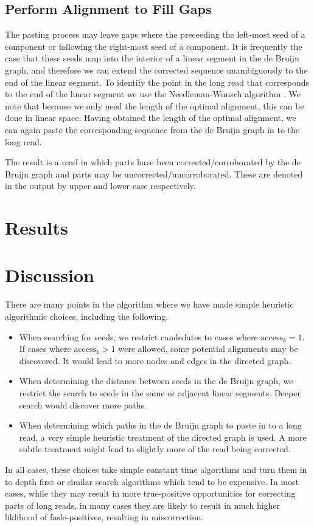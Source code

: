\documentclass[twocolumn]{article}
\begin{document}
\subsection{Perform Alignment to Fill Gaps}
\label{sec:gaps}

The pasting process may leave gaps where the preceeding the left-most
seed of a component or following the right-most seed of a component.
It is frequently the case that these seeds map into the interior
of a linear segment in the de Bruijn graph, and therefore we can
extend the corrected sequence unambiguously to the end of the linear
segment. To identify the point in the long read that corresponds
to the end of the linear segment we use the Needleman-Wunsch algorithm
\cite{Needleman}. We note that because we only need the length of
the optimal alignment, this can be done in linear space.
Having obtained the length of the optimal alignment, we can again
paste the corresponding sequence from the de Bruijn graph in to the
long read.

The result is a read in which parts have been corrected/corroborated by
the de Bruijn graph and parts may be uncorrected/uncorroborated. These
are denoted in the output by upper and lower case respectively.

\section{Results}

\section{Discussion}

There are many points in the algorithm where we have made simple heuristic algorithmic choices,
including the following.
\begin{itemize}
\item When searching for seeds, we restrict candedates to cases where $\textrm{access}_k = 1$. If cases
where $\textrm{access}_k > 1$ were allowed, some potential alignments may be discovered. It would lead to
more nodes and edges in the directed graph.
\item When determining the distance between seeds in the de Bruijn graph, we restrict the search to seeds
in the same or adjacent linear segments. Deeper search would discover more paths.
\item When determining which paths in the de Bruijn graph to paste in to a long read, a very simple heuristic
treatment of the directed graph is used. A more subtle treatment might lead to slightly more of the read being
corrected.
\end{itemize}

In all cases, these choices take simple constant time algorithms
and turn them in to depth first or similar search algorithms which
tend to be expensive. In most cases, while they may result in more
true-positive opportunities for correcting parts of long reads, in
many cases they are likely to result in much higher liklihood of
fasle-positives, resulting in miscorrection.
\end{document}
